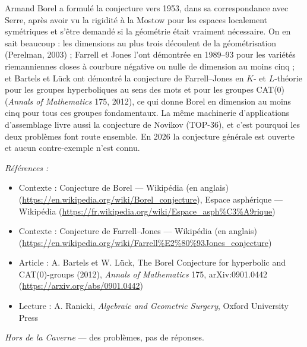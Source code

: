\documentclass[11pt]{article}
\newenvironment{refs}{\par\small\noindent\emph{Références :}\begin{itemize}\setlength\itemsep{0pt}}{\end{itemize}\normalsize}
\begin{document}
\noindent Armand Borel a formulé la conjecture vers 1953, dans sa correspondance avec Serre,
après avoir vu la rigidité à la Mostow pour les espaces localement symétriques et s'être demandé si la
géométrie était vraiment nécessaire. On en sait beaucoup : les dimensions au plus trois découlent de la
géométrisation (Perelman, 2003) ; Farrell et Jones l'ont démontrée en 1989--93 pour les variétés
riemanniennes closes à courbure négative ou nulle de dimension au moins cinq ; et Bartels et Lück ont
démontré la conjecture de Farrell--Jones en $ K $- et $ L $-théorie pour les groupes hyperboliques au
sens des mots et pour les groupes CAT(0) (\textit{Annals of Mathematics} 175, 2012), ce qui donne Borel en
dimension au moins cinq pour tous ces groupes fondamentaux. La même machinerie d'applications d'assemblage
livre aussi la conjecture de Novikov (TOP-36), et c'est pourquoi les deux problèmes font route ensemble. En
2026 la conjecture générale est ouverte et aucun contre-exemple n'est connu.

\begin{refs}
\item Contexte : Conjecture de Borel --- Wikipédia (en anglais) (\url{https://en.wikipedia.org/wiki/Borel_conjecture}), Espace asphérique --- Wikipédia (\url{https://fr.wikipedia.org/wiki/Espace_asph%C3%A9rique})
\item Contexte : Conjecture de Farrell--Jones --- Wikipédia (en anglais) (\url{https://en.wikipedia.org/wiki/Farrell%E2%80%93Jones_conjecture})
\item Article : A. Bartels et W. Lück, \og{} The Borel Conjecture for hyperbolic and CAT(0)-groups \fg{} (2012), \textit{Annals of Mathematics} 175, arXiv:0901.0442 (\url{https://arxiv.org/abs/0901.0442})
\item Lecture : A. Ranicki, \textit{Algebraic and Geometric Surgery}, Oxford University Press
\end{refs}

\bigskip


\vfill
\noindent\emph{Hors de la Caverne} --- des probl\`emes, pas de r\'eponses.
\end{document}
